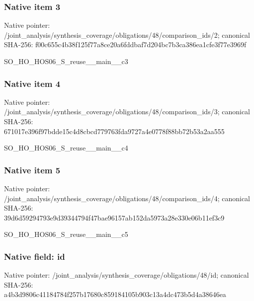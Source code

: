 \documentclass[10pt,a4paper]{article}
\begin{document}
\subsubsection{Native item 3}
Native pointer: /joint\_\allowbreak{}analysis/synthesis\_\allowbreak{}coverage/obligations/48/comparison\_\allowbreak{}ids/2; canonical SHA-256: f00c655c4b38f125f77a8ce20a6fddbaf7d204bc7b3ca386ea1cfe3f77e3969f

\begingroup\raggedright\sloppy SO\_\allowbreak{}HO\_\allowbreak{}HOS06\_\allowbreak{}S\_\allowbreak{}reuse\_\allowbreak{}\_\allowbreak{}main\_\allowbreak{}\_\allowbreak{}c3\par\endgroup

\subsubsection{Native item 4}
Native pointer: /joint\_\allowbreak{}analysis/synthesis\_\allowbreak{}coverage/obligations/48/comparison\_\allowbreak{}ids/3; canonical SHA-256: 671017e396f97bdde15c4d8cbcd779763fda9727a4e0778f88bb72b53a2aa555

\begingroup\raggedright\sloppy SO\_\allowbreak{}HO\_\allowbreak{}HOS06\_\allowbreak{}S\_\allowbreak{}reuse\_\allowbreak{}\_\allowbreak{}main\_\allowbreak{}\_\allowbreak{}c4\par\endgroup

\subsubsection{Native item 5}
Native pointer: /joint\_\allowbreak{}analysis/synthesis\_\allowbreak{}coverage/obligations/48/comparison\_\allowbreak{}ids/4; canonical SHA-256: 39d6d59294793e9d39344794f47bae96157ab152da5973a28e330e06b11ef3c9

\begingroup\raggedright\sloppy SO\_\allowbreak{}HO\_\allowbreak{}HOS06\_\allowbreak{}S\_\allowbreak{}reuse\_\allowbreak{}\_\allowbreak{}main\_\allowbreak{}\_\allowbreak{}c5\par\endgroup

\subsubsection{Native field: id}
Native pointer: /joint\_\allowbreak{}analysis/synthesis\_\allowbreak{}coverage/obligations/48/id; canonical SHA-256: a4b3d9806c41184784f257b17680c859184105b903c13a4dc473b5d4a38646ea
\end{document}
